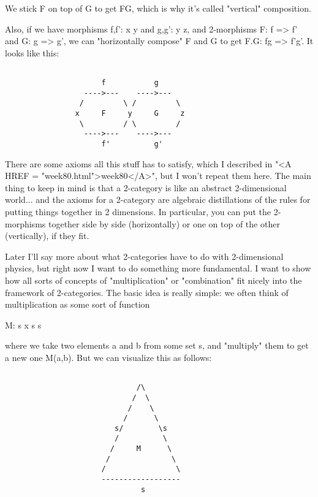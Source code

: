 We stick F on top of G to get FG, which is why it's called "vertical"
composition.

Also, if we have morphisms f,f': x \to  y and g,g': y \to  z, and 2-morphisms
F: f => f' and G: g => g', we can "horizontally compose" F and G to get
F.G: fg => f'g'.  It looks like this:


\begin{verbatim}

                      f           g
                  ---->---    ---->---
                 /         \ /         \
                x     F     y     G     z
                 \         / \         /
                  ---->---    ---->---
                      f'          g' 

\end{verbatim}
    
There are some axioms all this stuff has to satisfy, which I described
in "<A HREF = "week80.html">week80</A>", but I won't repeat them here.  The main thing to keep in
mind is that a 2-category is like an abstract 2-dimensional world... and
the axioms for a 2-category are algebraic distillations of the rules for
putting things together in 2 dimensions.  In particular, you can put the
2-morphisms together side by side (horizontally) or one on top of the
other (vertically), if they fit.   

Later I'll say more about what 2-categories have to do with
2-dimensional physics, but right now I want to do something more 
fundamental.  I want to show how all sorts of concepts of
"multiplication" or "combination" fit nicely into the framework of
2-categories.   The basic idea is really simple: we often think of
multiplication as some sort of function

M: s x s \to  s

where we take two elements a and b from some set s, and "multiply" them
to get a new one M(a,b).  But we can visualize this as follows:


\begin{verbatim}

                              /\
                             /  \
                            /    \
                           /      \
                         s/        \s
                         /          \
                        /     M      \
                       /              \
                      /                \
                      ------------------
                               s

\end{verbatim}
    
